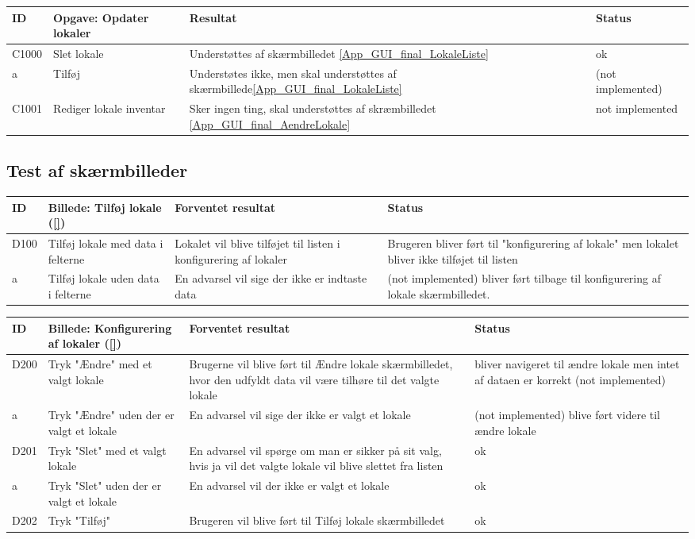 \begin{tabular}{ |p{1cm}| p{5cm} | p{4cm} | p{1cm} | }
\hline
	ID & Opgave: Opdater lokaler & Resultat & Status\\ 
\hline
	C1000 & Slet lokale & Understøttes af skærmbilledet \ref{App_GUI_final_LokaleListe} & ok \\
\hline
	a & Tilføj &Understøtes ikke, men skal understøttes af skærmbillede\ref{App_GUI_final_LokaleListe} & (not implemented) \\
\hline
	C1001 & Rediger lokale inventar &Sker ingen ting, skal understøttes af skræmbilledet \ref{App_GUI_final_AendreLokale} & not implemented \\
\hline
\end{tabular}


\subsection{Test af skærmbilleder}
 \label{App_Test_ListOfTest_ScreenTests}

\begin{tabular}{ |p{1cm}| p{5cm} | p{4cm} | p{1cm} | }
\hline
ID & Billede: Tilføj lokale (\ref{})  & Forventet resultat & Status\\ 
\hline
D100 &Tilføj lokale med data i felterne & Lokalet vil blive tilføjet til listen i konfigurering af lokaler & Brugeren bliver ført til "konfigurering af lokale" men lokalet bliver ikke tilføjet til listen \\
\hline
a & Tilføj lokale uden data i felterne  & En advarsel vil sige der ikke er indtaste data &(not implemented) bliver ført tilbage til konfigurering af lokale skærmbilledet. \\
\hline
\end{tabular}

\begin{tabular}{ |p{1cm}| p{5cm} | p{4cm} | p{1cm} | }
\hline
ID & Billede: Konfigurering af lokaler (\ref{}) & Forventet resultat & Status\\ 
\hline
D200 & Tryk "Ændre" med et valgt lokale & Brugerne vil blive ført til Ændre lokale skærmbilledet, hvor den udfyldt data vil være tilhøre til det valgte lokale & bliver navigeret til ændre lokale men intet af dataen er korrekt (not implemented) \\
\hline
a & Tryk "Ændre" uden der er valgt et lokale & En advarsel vil sige der ikke er valgt et lokale & (not implemented) blive ført videre til ændre lokale \\
\hline
D201 & Tryk "Slet" med et valgt lokale &En advarsel vil spørge om man er sikker på sit valg, hvis ja vil det valgte lokale vil blive slettet fra listen & ok \\
\hline
a & Tryk "Slet" uden der er valgt et lokale & En advarsel vil der ikke er valgt et lokale & ok \\
\hline
D202 & Tryk "Tilføj" & Brugeren vil blive ført til Tilføj lokale skærmbilledet & ok\\
\hline
\end{tabular}

